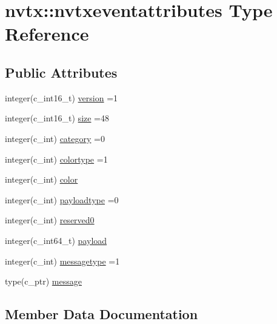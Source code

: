 \hypertarget{structnvtx_1_1nvtxeventattributes}{}\section{nvtx\+:\+:nvtxeventattributes Type Reference}
\label{structnvtx_1_1nvtxeventattributes}
\subsection*{Public Attributes}
\begin{DoxyCompactItemize}
\item 
integer(c\+\_\+int16\+\_\+t) \hyperlink{structnvtx_1_1nvtxeventattributes_a3e1c1186627d3585041f5107f7a2c6cf}{version} =1
\item 
integer(c\+\_\+int16\+\_\+t) \hyperlink{structnvtx_1_1nvtxeventattributes_a073c788ac024351d153f5fa2a54a03dc}{size} =48
\item 
integer(c\+\_\+int) \hyperlink{structnvtx_1_1nvtxeventattributes_a76a24ba48d19336d353e253605ec177a}{category} =0
\item 
integer(c\+\_\+int) \hyperlink{structnvtx_1_1nvtxeventattributes_a31a68afdd45c9dbc5b60759d6a43da80}{colortype} =1
\item 
integer(c\+\_\+int) \hyperlink{structnvtx_1_1nvtxeventattributes_a77bb01e48bd71036991bf1232f5e4dd0}{color}
\item 
integer(c\+\_\+int) \hyperlink{structnvtx_1_1nvtxeventattributes_a5c6946881915f624b3080b708501bf74}{payloadtype} =0
\item 
integer(c\+\_\+int) \hyperlink{structnvtx_1_1nvtxeventattributes_aa109ecc1e38adcbf2b52661ed72e6286}{reserved0}
\item 
integer(c\+\_\+int64\+\_\+t) \hyperlink{structnvtx_1_1nvtxeventattributes_a4f3974f0da3b572f86b0358c46a5e09b}{payload}
\item 
integer(c\+\_\+int) \hyperlink{structnvtx_1_1nvtxeventattributes_af2fd0cfacc31da95db6a9037ace4bcdc}{messagetype} =1
\item 
type(c\+\_\+ptr) \hyperlink{structnvtx_1_1nvtxeventattributes_a988faa8b845122161036f87fe2034ee1}{message}
\end{DoxyCompactItemize}


\subsection{Member Data Documentation}
\mbox{\label{structnvtx_1_1nvtxeventattributes_a76a24ba48d19336d353e253605ec177a}} 
